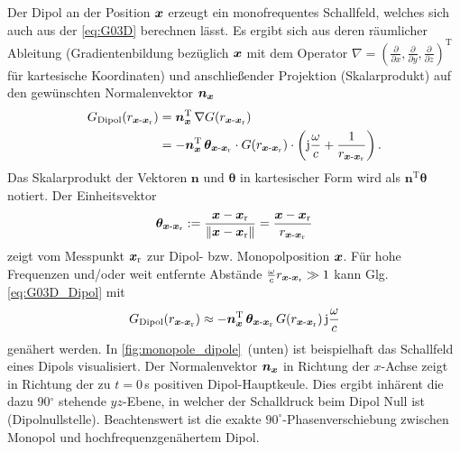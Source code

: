 Der Dipol an der Position $\bm{x}$ erzeugt ein monofrequentes Schallfeld, welches
sich auch aus der \Glg\eqref{eq:G03D} berechnen lässt.
%
Es ergibt sich aus deren räumlicher Ableitung
(Gradientenbildung bezüglich $\bm{x}$ mit dem Operator
$\nabla = (\frac{\partial}{\partial x},\frac{\partial}{\partial y},\frac{\partial}{\partial z})^\mathrm{T}$
für kartesische Koordinaten)
und anschließender Projektion (Skalarprodukt) auf den gewünschten
Normalenvektor $\bm{n}_{\bm{x}}$
%
\begin{align}
\label{eq:G03D_Dipol}
G_\text{Dipol}(r_{\xs\text{-}\xr}) &=
\nxT \, \nabla G(r_{\xs\text{-}\xr}) \nonumber\\
&= -\nxT\,\bm{\theta}_{\xs\text{-}\xr}\cdot
G(r_{\xs\text{-}\xr}) \cdot \left(\im\wc +\frac{1}{r_{\xs\text{-}\xr}}\right).
\end{align}
%
Das Skalarprodukt der Vektoren $\bm{n}$ und $\bm{\theta}$ in
kartesischer Form wird als $\bm{n}^\mathrm{T} \bm{\theta}$ notiert.
%
Der Einheitsvektor
\begin{align}
\bm{\theta}_{\bm{x}\text{-}\bm{x}_\mathrm{r}} :=
\frac{\bm{x}-\bm{x}_\mathrm{r}}{\|\bm{x}-\bm{x}_\mathrm{r}\|}  =
\frac{\bm{x}-\bm{x}_\mathrm{r}}{r_{\bm{x}\text{-}\bm{x}_\mathrm{r}}}
\end{align}
zeigt vom Messpunkt $\bm{x}_\mathrm{r}$ zur Dipol- bzw. Monopolposition $\bm{x}$.
%
Für hohe Frequenzen und/oder weit entfernte Abstände
$\frac{\omega}{c} r_{\bm{x}\text{-}\bm{x}_\mathrm{r}} \gg 1$ kann Glg.\,\eqref{eq:G03D_Dipol}
mit
\begin{align}
\label{eq:DipolHF}
G_\text{Dipol}(r_{\xs\text{-}\xr}) \approx
-\nxT\,\bm{\theta}_{\xs\text{-}\xr}\,
G(r_{\xs\text{-}\xr}) \, \im\wc
\end{align}
genähert werden.
%
In \Abb\ref{fig:monopole_dipole}~(unten) ist beispielhaft das Schallfeld
eines Dipols visualisiert.
%
Der Normalenvektor $\bm{n}_{\bm{x}}$ in Richtung der $x$-Achse zeigt in Richtung der
zu $t=0$\,s positiven Dipol-Hauptkeule.
%
Dies ergibt inhärent die dazu 90$^\circ$ stehende $yz$-Ebene, in welcher der
Schalldruck beim Dipol Null ist (Dipolnullstelle).
%
Beachtenswert ist die exakte $90^\circ$-Phasenverschiebung zwischen Monopol und
hochfrequenzgenähertem Dipol.



